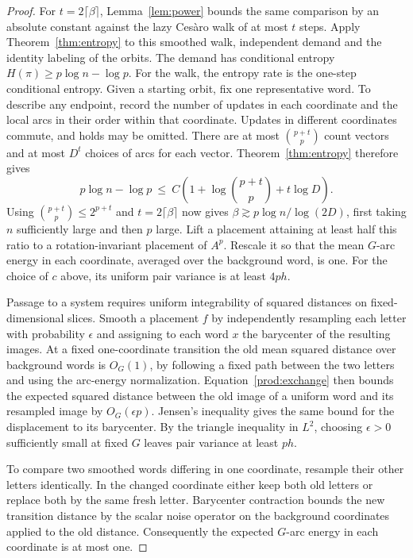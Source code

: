 \begin{proof}
For $t=2\lceil\beta\rceil$, Lemma~\ref{lem:power} bounds the same
comparison by an absolute constant against the lazy Ces\`aro walk
of at most $t$ steps. Apply Theorem~\ref{thm:entropy} to this smoothed
walk, independent demand and the identity labeling of the orbits.
The demand has conditional entropy $H(\pi)\ge p\log n-\log p$.
For the walk, the entropy rate is the one-step conditional entropy.
Given a starting orbit, fix one representative word. To describe any
endpoint, record the number of updates in each coordinate and the
local arcs in their order within that coordinate. Updates in different
coordinates commute, and holds may be omitted. There are at most
$\binom{p+t}{p}$ count vectors and at most $D^t$ choices of arcs
for each vector. Theorem~\ref{thm:entropy} therefore gives
\[
 p\log n-\log p\ \le\
 C\left(1+\log\binom{p+t}{p}+t\log D\right).
\]
Using $\binom{p+t}{p}\le2^{p+t}$ and $t=2\lceil\beta\rceil$ now gives
$\beta\gtrsim p\log n/\log(2D)$, first taking $n$ sufficiently large
and then $p$ large. Lift a placement attaining at least half this ratio
to a rotation-invariant placement of $A^p$. Rescale it so that the
mean $G$-arc energy in each coordinate, averaged over the background
word, is one. For the choice of $c$ above, its uniform pair variance
is at least $4ph$.

Passage to a system requires uniform integrability of squared distances
on fixed-dimensional slices. Smooth a placement $f$ by independently
resampling each letter with probability $\epsilon$ and assigning to
each word $x$ the barycenter of the resulting images. At a fixed
one-coordinate transition the old mean squared distance over background
words is $O_G(1)$, by following a fixed path between the two letters and
using the arc-energy normalization. Equation~\eqref{prod:exchange}
then bounds the expected squared distance between the old image of a
uniform word and its resampled image by $O_G(\epsilon p)$. Jensen's
inequality gives the same bound for the displacement to its barycenter.
By the triangle inequality in $L^2$, choosing $\epsilon>0$ sufficiently
small at fixed $G$ leaves pair variance at least $ph$.

To compare two smoothed words differing in one coordinate, resample
their other letters identically. In the changed coordinate either keep
both old letters or replace both by the same fresh letter. Barycenter
contraction bounds the new transition distance by the scalar noise
operator on the background coordinates applied to the old distance.
Consequently the expected $G$-arc energy in each coordinate is at most one.


\end{proof}
